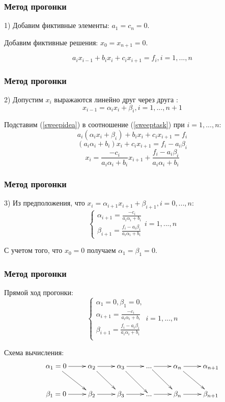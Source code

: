 \documentclass[10pt]{beamer}
\begin{document}
\begin{frame}[fragile]
\frametitle{Метод прогонки}
1) Добавим фиктивные элементы: $a_1 = c_n = 0$. 

Добавим фиктивные решения: $x_0 = x_{n+1} = 0$.

\begin{equation}
\label{sweeptask}
a_i x_{i-1} + b_i x_i + c_i x_{i+1} = f_i, i = 1,..., n
\end{equation}

\end{frame}


\begin{frame}[fragile]
\frametitle{Метод прогонки}
2) Допустим $x_i$ выражаются линейно друг через друга :
\begin{equation}
\label{sweepidea}
x_{i-1} = \alpha_i x_i + \beta_i, i = 1, ..., n+1
\end{equation}

Подставим (\ref{sweepidea}) в соотношение (\ref{sweeptask}) при $i = 1, ...,  n$:
$$ a_i  ( \alpha_i x_i + \beta_i ) + b_i x_i + c_i x_{i+1} = f_i$$
$$ (a_i  \alpha_i + b_i) x_i + c_i x_{i+1} = f_i - a_i \beta_i$$
$$ x_i = \frac{- c_i}{a_i  \alpha_i + b_i} x_{i+1} + \frac{f_i - a_i \beta_i}{a_i  \alpha_i + b_i}$$
\end{frame}


\begin{frame}[fragile]
\frametitle{Метод прогонки}
3) Из предположения, что $x_{i} = \alpha_{i+1} x_{i+1} + \beta_{i+1}, i = 0, ..., n
$:
$$
\begin{cases}
\alpha_{i+1} = \frac{- c_i}{a_i  \alpha_i + b_i} \\
\beta_{i+1} = \frac{f_i - a_i \beta_i}{a_i  \alpha_i + b_i}
\end{cases}
i = 1, ..., n
$$

С учетом того, что $x_0 = 0$ получаем $\alpha_1 = \beta_1 = 0$.
\end{frame}


\begin{frame}[fragile]
\frametitle{Метод прогонки}
Прямой ход прогонки:
\begin{equation}
\label{sweepfor}
\begin{cases}
\alpha_1 = 0, \beta_1 = 0,\\
\alpha_{i+1} = \frac{- c_i}{a_i  \alpha_i + b_i}\\
\beta_{i+1} = \frac{f_i - a_i \beta_i}{a_i  \alpha_i + b_i}\\
\end{cases}
i = 1, ..., n
\end{equation}

Схема вычисления:
\begin{displaymath} 
\xymatrix{
\alpha_1 = 0 \ar[r] \ar[rd] & \alpha_2 \ar[r] \ar[rd] & \alpha_3 \ar[r] \ar[rd] & ... \ar[r] \ar[rd]  & 
\alpha_n \ar[r] \ar[rd]     & \alpha_{n+1}	\\ 
\beta_1 = 0 \ar[r]          & \beta_2 \ar[r]          & \beta_3 \ar[r]          & ... \ar[r]          & 
\beta_n \ar[r]              &  \beta_{n+1}	\\ 
}
\end{displaymath}
\end{frame}
\end{document}
